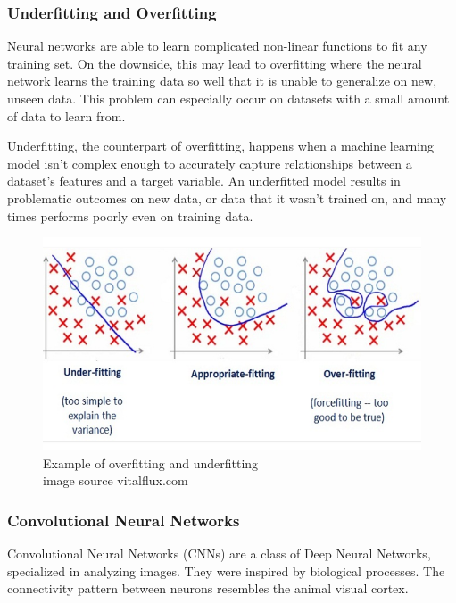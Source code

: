 \clearpage
\subsubsection{Underfitting and Overfitting}

Neural networks are able to learn complicated non-linear functions to fit any training set. On the downside, this may lead to overfitting where the neural network learns the training data so well that it is unable to generalize on new, unseen data. This problem can especially occur on datasets with a small amount of data to learn from. \par

Underfitting, the counterpart of overfitting, happens when a machine learning model isn’t complex enough to accurately capture relationships between a dataset’s features and a target variable. An underfitted model results in problematic outcomes on new data, or data that it wasn’t trained on, and many times performs poorly even on training data. \par


\begin{figure}[h]
	\caption[Example of overfitting and underfitting]{Example of overfitting and underfitting
		\\ image source vitalflux.com}
	\centering
	\includegraphics[width=1\textwidth, height=\textheight, keepaspectratio]{"resources/overfitting"}
\end{figure}

\subsubsection{Convolutional Neural Networks}
\par
Convolutional Neural Networks (CNNs) are a class of Deep Neural Networks,
specialized in analyzing images. They were inspired by biological processes.
The connectivity pattern between neurons resembles the animal visual cortex.
\cite{cnn} \par


